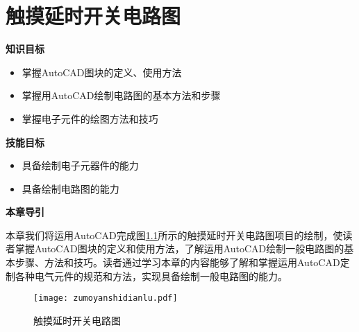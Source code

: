 \chapter{触摸延时开关电路图}

{\bfseries 知识目标}
\begin{itemize}
\item 掌握AutoCAD图块的定义、使用方法
\item 掌握用AutoCAD绘制电路图的基本方法和步骤
\item 掌握电子元件的绘图方法和技巧
\end{itemize}

{\bfseries 技能目标}
\begin{itemize}
\item 具备绘制电子元器件的能力
\item 具备绘制电路图的能力
\end{itemize}

{\bfseries 本章导引}

本章我们将运用AutoCAD完成图\ref{fig:zhumodianlu}所示的触摸延时开关电路图项目的绘制，使读者掌握AutoCAD图块的定义和使用方法，了解运用AutoCAD绘制一般电路图的基本步骤、方法和技巧。读者通过学习本章的内容能够了解和掌握运用AutoCAD定制各种电气元件的规范和方法，实现具备绘制一般电路图的能力。
\noindent
\begin{figure}[htbp]
\centering
\texttt{[image: zumoyanshidianlu.pdf]}
\caption{触摸延时开关电路图}\label{fig:zhumodianlu}
\end{figure}
\indent

\endinput

